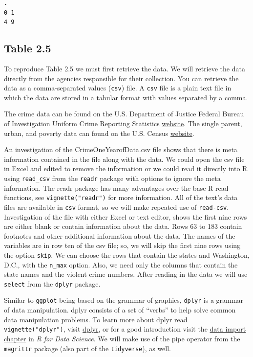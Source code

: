 \documentclass[]{book}
\begin{document}
\begin{verbatim}
.
0 1 
4 9 
\end{verbatim}

\hypertarget{table-2.5}{%
\subsection{Table 2.5}\label{table-2.5}}

To reproduce Table 2.5 we must first retrieve the data. We will retrieve the data directly from the agencies responsible for their collection. You can retrieve the data as a comma-separated values (\texttt{csv}) file. A \texttt{csv} file is a plain text file in which the data are stored in a tabular format with values separated by a comma.

The crime data can be found on the U.S. Department of Justice Federal Bureau of Investigation Uniform Crime Reporting Statistics \href{https://www.ucrdatatool.gov/}{website}. The single parent, urban, and poverty data can found on the U.S. Census \href{https://www.census.gov/}{website}.

An investigation of the CrimeOneYearofData.csv file shows that there is meta information contained in the file along with the data. We could open the csv file in Excel and edited to remove the information or we could read it directly into R using \texttt{read\_csv} from the \texttt{readr} package with options to ignore the meta information. The readr package has many advantages over the base R read functions, see \texttt{vignette("readr")} for more information. All of the text's data files are available in \texttt{csv} format, so we will make repeated use of \texttt{read-csv}. Investigation of the file with either Excel or text editor, shows the first nine rows are either blank or contain information about the data. Rows 63 to 183 contain footnotes and other additional information about the data. The names of the variables are in row ten of the csv file; so, we will skip the first nine rows using the option \texttt{skip}. We can choose the rows that contain the states and Washington, D.C., with the \texttt{n\_max} option. Also, we need only the columns that contain the state names and the violent crime numbers. After reading in the data we will use \texttt{select} from the \texttt{dplyr} package.

Similar to \texttt{ggplot} being based on the grammar of graphics, \texttt{dplyr} is a grammar of data manipulation. dplyr consists of a set of ``verbs'' to help solve common data manipulation problems. To learn more about dplyr read \texttt{vignette("dplyr")}, visit \href{https://dplyr.tidyverse.org/}{dplyr}, or for a good introduction visit the \href{https://r4ds.had.co.nz/transform.html}{data import chapter} in \emph{R for Data Science}. We will make use of the pipe operator from the \texttt{magrittr} package (also part of the \texttt{tidyverse}), as well.
\end{document}
